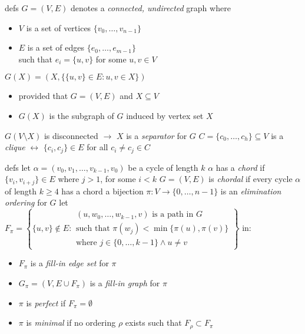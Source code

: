 \documentclass{beamer}
\begin{document}
\begin{frame}{defs}
$G = (V, E)$ denotes a \textit{connected, undirected} graph where
\begin{itemize}
    \item $V$ is a set of vertices $\lbrace v_{0}, \ldots, v_{n-1} \rbrace$
    \item $E$ is a set of edges $\lbrace e_{0}, \ldots, e_{m-1} \rbrace$ \\
    such that $e_{i}= \lbrace u, v \rbrace$ for some $u, v\in V$
\end{itemize}
\vfill
$G(X)=\left(X,  \lbrace \lbrace u, v \rbrace \in E: u, v\in X \rbrace\right)$ 
\begin{itemize}
    \item provided that $G=(V, E)$ and $X\subseteq V$
    \item $G(X)$ is the subgraph of $G$ induced by vertex set $X$
\end{itemize}
\vfill
$G(V\setminus X)$ is disconnected $\rightarrow$ $X$ is a \textit{separator} for $G$
\vfill
$C= \lbrace c_{0}, \ldots, c_{h} \rbrace\subseteq V$ is a \textit{clique}
$\leftrightarrow$ $\lbrace c_{i}, c_{j} \rbrace \in E$ for all $c_{i}\neq c_{j}\in C$
\end{frame}

\begin{frame}{defs}
let $\alpha = (v_{0}, v_{1}, \ldots, v_{k-1}, v_{0})$ be a cycle of length $k$
\vfill
$\alpha$ has a \textit{chord} if $\lbrace v_{i},v_{i+j} \rbrace\in E$ where
$j>1$, for some $i<k$
\vfill
$G=(V, E)$ is \textit{chordal} if every cycle $\alpha$ of length $k\geq 4$ has a chord
\vfill
a bijection $\pi: V \rightarrow  \lbrace 0, \ldots, n-1 \rbrace$  is an
\textit{elimination ordering} for $G$
\vfill
let $F_{\pi} = \left\lbrace \lbrace u, v \rbrace \not\in E:
        \begin{array}{l}
            (u, w_{0}, \ldots, w_{k-1}, v) \text{ is a path in } G\\ 
            \text{such that } \pi(w_{j})< \min{ \lbrace \pi(u), \pi(v) \rbrace}\\
            \text{where } j\in  \lbrace 0, \ldots, k-1 \rbrace \wedge u\neq v
        \end{array}
        \right\rbrace$ in:
\begin{itemize}
    \item $F_{\pi}$ is a \textit{fill-in edge set} for $\pi$
    \item $G_{\pi}=(V, E\cup F_{\pi})$ is a \textit{fill-in graph} for $\pi$ 
    \item $\pi$ is \textit{perfect} if $F_{\pi}=\emptyset$
    \item $\pi$ is \textit{minimal} if no ordering $\rho$ exists such that
    $F_{\rho}\subset F_{\pi}$
\end{itemize}
\end{frame}
\end{document}
